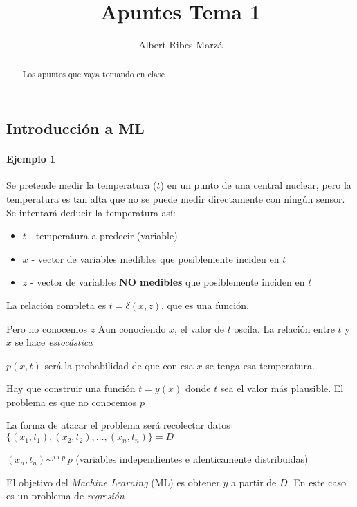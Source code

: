 \documentclass[a4paper,10pt]{article}
\title{Apuntes Tema 1}
\author{Albert Ribes Marzá}
\begin{document}
\maketitle

\begin{abstract}
Los apuntes que vaya tomando en clase
\end{abstract}

\section{}
\subsection{Introducción a ML}
\paragraph{Ejemplo 1}
Se pretende medir la temperatura ($t$) en un punto de una central nuclear, pero la temperatura es tan alta que no se puede medir directamente con ningún sensor. Se intentará deducir la temperatura así:
\begin{itemize}
\item $t$ - temperatura a predecir (variable)
\item $x$ - vector de variables medibles que posiblemente inciden en $t$
\item $z$ - vector de variables \textbf{NO medibles} que posiblemente inciden en $t$
\end{itemize}

La relación completa es $ t = \delta(x,z)$, que es una función.

Pero no conocemos $z$ \MVRightarrow Aun conociendo $x$, el valor de $t$ oscila. La relación entre $t$ y $x$ se hace \textit{estocástica}

$p(x,t)$ será la probabilidad de que con esa $x$ se tenga esa temperatura.

Hay que construir una función $t = y(x)$ donde $t$ sea el valor más plausible. El problema es que no conocemos $p$

La forma de atacar el problema será recolectar datos $\{(x_1,t_1),(x_2,t_2), \dots ,(x_n,t_n)\} = D$

$(x_n,t_n) \sim^{i.i.p.} p$ (variables independientes e identicamente distribuidas)


El objetivo del \textit{Machine Learning} (ML) es obtener $y$ a partir de $D$. En este caso es un problema de \textit{regresión}
\end{document}
